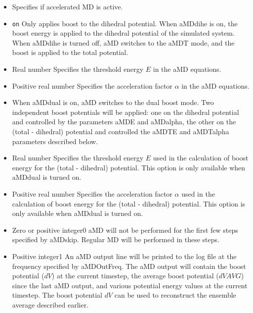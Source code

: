 \begin{itemize}

\item
{}
{Specifies if accelerated MD is active.}

\item
{} {{\tt on}} 
{Only applies boost to the dihedral potential. 
When aMDdihe is on, the boost energy is applied to the dihedral potential of the simulated system.
When aMDdihe is turned off, aMD switches to the aMDT mode, and the boost is applied to the total potential.
}

\item
{}
{Real number}
{Specifies the threshold energy $E$ in the aMD equations. 
}

\item
{}
{Positive real number}
{Specifies the acceleration factor $\alpha$ in the aMD equations. 
}

\item
{}
{When aMDdual is on, aMD switches to the dual boost mode. Two independent boost potentials 
will be applied: one on the dihedral potential and controlled by the parameters aMDE and aMDalpha,
the other on the (total - dihedral) potential and controlled the aMDTE and aMDTalpha parameters described below.
}

\item
{}
{Real number}
{Specifies the threshold energy $E$ used in the calculation of boost energy for the (total - dihedral) potential. 
This option is only available when aMDdual is turned on.
}

\item
{}
{Positive real number}
{Specifies the acceleration factor $\alpha$ used in the calculation of boost energy for the (total - dihedral) potential. 
This option is only available when aMDdual is turned on.
}

\item
{}
{Zero or positive integer}{0}
{aMD will not be performed for the first few steps specified by aMDskip. Regular MD will be performed in these steps.
}

\item
{}
{Positive integer}{1}
{An aMD output line will be printed to the log file at the frequency specified by aMDOutFreq.
The aMD output will contain the boost potential ($dV$) at the current timestep, 
the average boost potential ($dVAVG$) since the last aMD output, and various potential energy values at the current timestep.
The boost potential $dV$ can be used to reconstruct the ensemble average described earlier.
}

\end{itemize}

